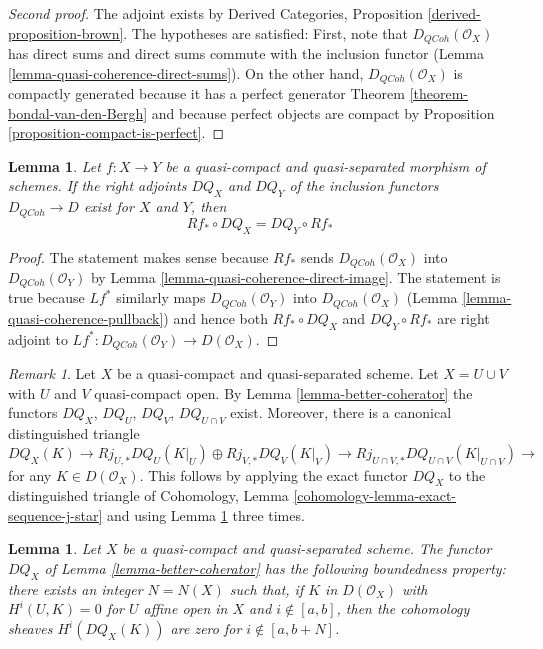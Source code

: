 \documentclass{stacks-project}
\theoremstyle{plain}
\newtheorem{lemma}[subsection]{Lemma}
\theoremstyle{definition}
\theoremstyle{remark}
\newtheorem{remark}[subsection]{Remark}
\numberwithin{equation}{subsection}
\def\QCoh{\mathit{QCoh}}
\begin{document}
\begin{proof}[Second proof]
The adjoint exists by Derived Categories, Proposition
\ref{derived-proposition-brown}. The hypotheses are satisfied:
First, note that $D_\QCoh(\mathcal{O}_X)$ has direct sums
and direct sums commute with the inclusion functor
(Lemma \ref{lemma-quasi-coherence-direct-sums}).
On the other hand, $D_\QCoh(\mathcal{O}_X)$
is compactly generated because it has a perfect
generator Theorem \ref{theorem-bondal-van-den-Bergh}
and because perfect objects are compact by
Proposition \ref{proposition-compact-is-perfect}.
\end{proof}

\begin{lemma}
\label{lemma-pushforward-better-coherator}
Let $f : X \to Y$ be a quasi-compact and quasi-separated
morphism of schemes. If the right adjoints $DQ_X$ and $DQ_Y$
of the inclusion functors $D_\QCoh \to D$ exist for $X$ and $Y$, then
$$
Rf_* \circ DQ_X = DQ_Y \circ Rf_*
$$
\end{lemma}

\begin{proof}
The statement makes sense because $Rf_*$ sends
$D_\QCoh(\mathcal{O}_X)$ into $D_\QCoh(\mathcal{O}_Y)$ by
Lemma \ref{lemma-quasi-coherence-direct-image}.
The statement is true because $Lf^*$ similarly maps
$D_\QCoh(\mathcal{O}_Y)$ into $D_\QCoh(\mathcal{O}_X)$
(Lemma \ref{lemma-quasi-coherence-pullback})
and hence both $Rf_* \circ DQ_X$ and $DQ_Y \circ Rf_*$
are right adjoint to $Lf^* : D_\QCoh(\mathcal{O}_Y) \to D(\mathcal{O}_X)$.
\end{proof}

\begin{remark}
\label{remark-explain-consequence}
Let $X$ be a quasi-compact and quasi-separated scheme.
Let $X = U \cup V$ with $U$ and $V$ quasi-compact open.
By Lemma \ref{lemma-better-coherator} the functors
$DQ_X$, $DQ_U$, $DQ_V$, $DQ_{U \cap V}$ exist. Moreover, there is a
canonical distinguished triangle
$$
DQ_X(K) \to Rj_{U, *}DQ_U(K|_U) \oplus Rj_{V, *}DQ_V(K|_V)
\to Rj_{U \cap V, *}DQ_{U \cap V}(K|_{U \cap V}) \to
$$
for any $K \in D(\mathcal{O}_X)$. This follows by applying the
exact functor $DQ_X$ to the distinguished triangle of
Cohomology, Lemma \ref{cohomology-lemma-exact-sequence-j-star}
and using Lemma \ref{lemma-pushforward-better-coherator} three times.
\end{remark}

\begin{lemma}
\label{lemma-boundedness-better-coherator}
Let $X$ be a quasi-compact and quasi-separated scheme. The functor
$DQ_X$ of Lemma \ref{lemma-better-coherator}
has the following boundedness property:
there exists an integer $N = N(X)$ such that, if
$K$ in $D(\mathcal{O}_X)$ with
$H^i(U, K) = 0$ for $U$ affine open in $X$ and $i \not \in [a, b]$, then
the cohomology sheaves $H^i(DQ_X(K))$ are zero for
$i \not \in [a, b + N]$.
\end{lemma}
\end{document}
